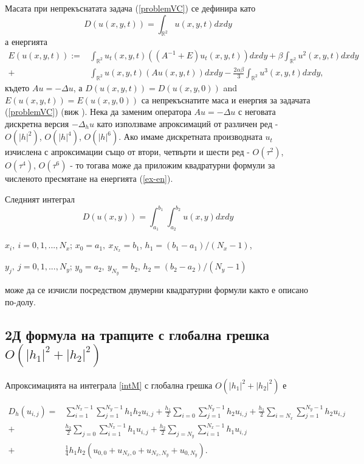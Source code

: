 \documentclass{article}
\newcommand{\rf}[1]{(\ref{#1})}
\newcommand{\RR}{\mathbb{R}}
\begin{document}
Масата при непрекъснатата задача \rf{problemVC} се дефинира като
\begin{equation}\label{intM}
D(u(x,y,t))=\int_{\RR^2} u(x,y,t)dx dy
\end{equation}
а енергията 
\begin{align}\label{ex-en}
E(u(x,y,t)):=&\int_{\RR^2} u_t(x,y,t) \left((A^{-1}+E)u_t(x,y,t)\right) dxdy+
\beta \int_{\RR^2} u^2(x,y,t) dxdy \nonumber\\
+& \int_{\RR^2}u(x,y,t) \left(A u(x,y,t)\right) dxdy
-\frac{2 \alpha \beta}{3} \int_{\RR^2} u^3(x,y,t) dxdy,
\end{align}
където $Au=-\Delta u$, а $D(u(x,y,t)) = D(u(x,y,0))$ and $E(u(x,y,t)) = E(u(x,y,0))$ са непрекъснатите маса и енергия за задачата \rf{problemVC} (виж \cite{ref1}). Нека да заменим оператора $Au=-\Delta u$ с неговата дискретна версия $-\Delta_h u$ като използваме апроксимаций от различен ред - $O(|h|^2)$, $O(|h|^4)$, $O(|h|^6)$. Ако имаме дискретната производната $u_t$ изчислена с апроксимации също от втори, четвърти и шести ред - $O(\tau^2)$, $O(\tau^4)$, $O(\tau^6)$ - то тогава може да приложим квадратурни формули за численото пресмятане на енергията \rf{ex-en}.

Следният интеграл
\begin{equation}\label{int}
D(u(x,y))=\int_{a_1}^{b_1} \int_{a_2}^{b_2} u(x,y)dx dy
\end{equation}

$x_i, ~i=0,1,...,N_x$; $x_0=a_1,~x_{N_x}=b_1$, $h_1=(b_1-a_1)/(N_x-1)$, 


$y_j, ~j=0,1,...,N_y$; $y_0=a_2,~y_{N_y}=b_2$,  $h_2=(b_2-a_2)/(N_y-1)$

може да се изчисли посредством двумерни квадратурни формули както е описано по-долу.

\subsection{ 2Д формула на трапците с глобална грешка $O(|h_1|^2+|h_2|^2)$ }

Апроксимацията на интеграла \eqref{intM} с глобална грешка $O(|h_1|^2+|h_2|^2)$ е

\begin{align}\label{quadr2}
D_h(u_{i,j}) =& \sum_{i=1}^{N_x-1} \sum_{j=1}^{N_y-1} h_1 h_2 u_{i,j}
+\frac{h_1}{2}\sum_{i=0} \sum_{j=1}^{N_y-1} h_2 u_{i,j}
+\frac{h_1}{2}\sum_{i=N_x} \sum_{j=1}^{N_y-1} h_2 u_{i,j} \nonumber\\
+&\frac{h_2}{2}\sum_{j=0} \sum_{i=1}^{N_x-1} h_1 u_{i,j}
+\frac{h_2}{2}\sum_{j=N_y} \sum_{i=1}^{N_x-1} h_1 u_{i,j}
\nonumber\\
+&\frac{1}{4}h_1 h_2 \left(u_{0,0}+u_{N_x,0}+u_{N_x,N_y}+u_{0,N_y}
\right).
\end{align}
\end{document}
